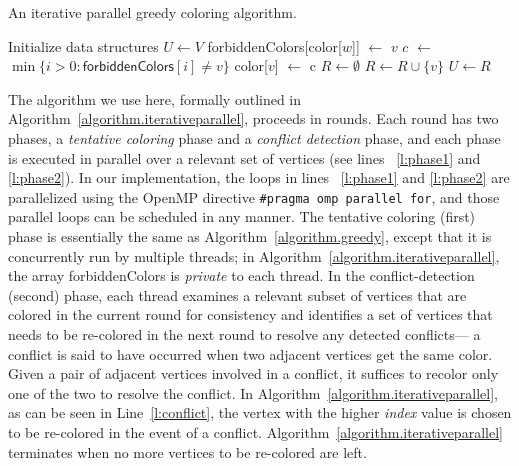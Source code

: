 \documentclass{article}
\begin{document}
\begin{algorithm}[t]
\small
\caption{An iterative parallel greedy coloring algorithm.} 
\label{algorithm.iterativeparallel}
\begin{algorithmic}[1]
\State Initialize data structures 
 \State $U \leftarrow V$ 
        \label{l:phase1} 
          \State \textsf{forbiddenColors}[\textsf{color}[$w$]] $\leftarrow$ $v$  
        \EndFor
        \State $c$  $\leftarrow$ $\min\{i>0: \textsf{forbiddenColors}[i] \neq v\}$ 
        \State \textsf{color}[$v$]  $\leftarrow$ c 
     \EndFor   
    \State $R \leftarrow  \emptyset$     
      \label{l:phase2}  
           \label{l:conflict}
            \State $R \leftarrow R \cup \{v\}$
          \EndIf
         \EndFor
      \EndFor
     \State $U \leftarrow R$
\EndWhile
\EndProcedure
\end{algorithmic}
\end{algorithm}

The algorithm we use here, formally outlined in Algorithm~\ref{algorithm.iterativeparallel},
proceeds in rounds. Each round has two phases, 
a {\em tentative coloring} phase and a {\em conflict detection} phase, and each phase is 
executed in parallel  over a relevant set of vertices (see lines ~\ref{l:phase1} and \ref{l:phase2}). 
In our implementation, the loops in lines ~\ref{l:phase1} and 
\ref{l:phase2} are parallelized using  the OpenMP directive \texttt{\#pragma omp parallel for}, 
and those parallel loops can  be scheduled in any manner.
The tentative coloring (first) phase is essentially the same as Algorithm~\ref{algorithm.greedy}, 
except that it is concurrently run by multiple threads;
in Algorithm~\ref{algorithm.iterativeparallel}, the array \textsf{forbiddenColors} is 
{\em private} to each thread.
In the conflict-detection (second) phase, each  thread examines a relevant subset
of vertices that are colored in the current round for consistency and identifies a set of vertices
that needs to be re-colored in the next round to resolve any detected conflicts--- a conflict is
said to have occurred when two adjacent vertices get the same color.
Given a pair of adjacent vertices involved in a conflict, 
it suffices to recolor only one of the two to resolve the conflict. 
In Algorithm~\ref{algorithm.iterativeparallel}, as can be seen in Line~\ref{l:conflict}, 
the vertex with the higher {\em index} value is chosen to be re-colored in the event of a conflict. 
Algorithm~\ref{algorithm.iterativeparallel} terminates when no more 
vertices to be re-colored are left. 
\end{document}
